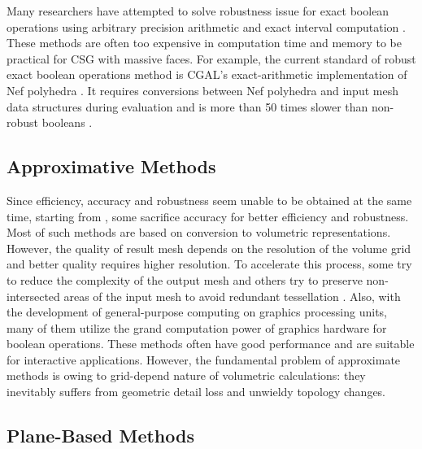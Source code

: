 \documentclass[10pt,journal,compsoc]{IEEEtran}
\begin{document}
Many researchers have attempted to solve robustness issue for exact boolean operations using arbitrary precision arithmetic \cite{banerjee1996topologically, fortune1995polyhedral, keyser2004esolid, granados2003boolean, hachenberger2005boolean} and exact interval computation \cite{fang1993robustness, hu1996robust, segal1990using}. These methods are often too expensive in computation time and memory to be practical for CSG with massive faces. For example,
the current standard of robust exact boolean operations method is CGAL's \cite{cgal:hk-bonp3-15a} exact-arithmetic implementation \cite{granados2003boolean} of Nef polyhedra \cite{bieri1988elementary}. It requires conversions between Nef polyhedra and input mesh data structures during evaluation and is more than 50 times slower than non-robust booleans \cite{bernstein2009fast}.


\subsection{Approximative Methods}

Since efficiency, accuracy and robustness seem unable to be obtained at the same time, starting from \cite{museth2002level}, some sacrifice accuracy for better efficiency and robustness. Most of such methods are based on conversion to volumetric representations. However, the quality of result mesh depends on the resolution of the volume grid and better quality requires higher resolution. To accelerate this process, some try to reduce the complexity of the output mesh \cite{varadhan2004topology} and others try to preserve non-intersected areas of the input mesh to avoid redundant tessellation \cite{pavic2010hybrid,wang2011approximate,zhao2011parallel,hable2005blister,ogayar2006gpu}. Also, with the development of general-purpose computing on graphics processing units, many of them utilize the grand computation power of graphics hardware for boolean operations. These methods often have good performance and are suitable for interactive applications. However, the fundamental problem of approximate methods is owing to grid-depend nature of volumetric calculations: they inevitably suffers from geometric detail loss and unwieldy topology changes.


\subsection{Plane-Based Methods}
\label{sec:pbrelated}
\end{document}
